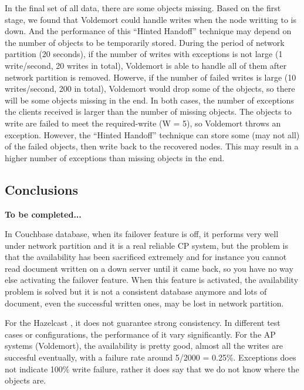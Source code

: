 \documentclass[a4paper]{article}
\begin{document}
In the final set of all data, there are some objects missing. Based on the first stage, we found that Voldemort could handle writes when the node writting to is down. 
And the performance of this ``Hinted Handoff'' technique may depend on the number of objects to be temporarily stored. During the period of network partition (20 seconds), 
if the number of writes with exceptions is not large (1 write/second, 20 writes in total), Voldemort is able to handle all of them after network partition is removed. 
Howerve, if the number of failed writes is large (10 writes/second, 200 in total), Voldemort would drop some of the objects, so there will be some objects missing in the end. 
In both cases, the number of exceptions the clients received is larger than the number of missing objects. The objects to write are failed to meet
the required-write (W = 5), so Voldemort throws an exception. However, the ``Hinted Handoff'' technique can store some (may not all) of the failed objects, then write back to
the recovered nodes. This may result in a higher number of exceptions than missing objects in the end.

\subsection{Conclusions}

{\bf To be completed...}

In Couchbase database, when its failover feature is off, it performs very well under network partition and it is a real reliable CP system, but the problem is that the availability has been sacrificed extremely and for instance you cannot read document written on a down server until it came back, so you have no way else activating the failover feature. When this feature is activated, the availability problem is solved but it is not a consistent database anymore and lots of document, even the successful written ones, may be lost in network partition.

For the Hazelcast , it does not guarantee strong consistency. In different test cases or configurations, the performance of it
vary significantly.
For the AP systems (Voldemort), the availability is pretty good, almost all the writes are succesful eventually, with a failure rate around 5/2000 = 0.25\%.
Exceptions does not indicate 100\% write failure, rather it does say that we do not know where the objects are.
\end{document}
